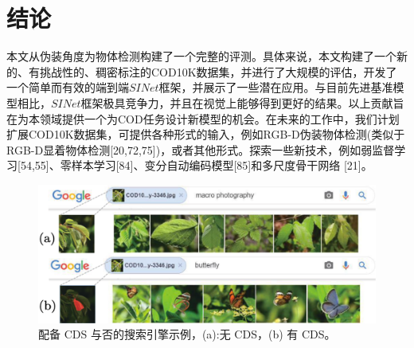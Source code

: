 \documentclass[final]{cvpr}
\begin{document}
\section{结论}\label{sec:Conclusion}
本文从伪装角度为物体检测构建了一个完整的评测。具体来说，本文构建了一个新的、有挑战性的、稠密标注的COD10K数据集，并进行了大规模的评估，开发了一个简单而有效的端到端$SINet$框架，并展示了一些潜在应用。与目前先进基准模型相比，$SINet$框架极具竞争力，并且在视觉上能够得到更好的结果。以上贡献旨在为本领域提供一个为COD任务设计新模型的机会。在未来的工作中，我们计划扩展COD10K数据集，可提供各种形式的输入，例如RGB-D伪装物体检测(类似于RGB-D显着物体检测[20,72,75])，或者其他形式。探索一些新技术，例如弱监督学习[54,55]、零样本学习[84]、变分自动编码模型[85]和多尺度骨干网络 [21]。

\begin{figure}[tp]
    \centering
    \includegraphics[width=\columnwidth]{COD_Zh_translate/figures/Application_SearchEngin.png}\small
    \caption{配备 CDS 与否的搜索引擎示例，(a):无 CDS，(b)
    有 CDS。}
    \label{fig:Application_SearchEngin}
\end{figure}
\end{document}
